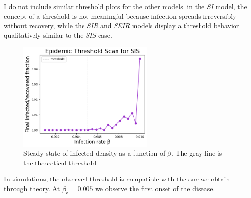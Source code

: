 I do not include similar threshold plots for the other models: in the \textit{SI} model, the concept of a threshold is not meaningful because infection spreads irreversibly without recovery, while the \textit{SIR} and \textit{SEIR} models display a threshold behavior qualitatively similar to the \textit{SIS} case.


\begin{figure}[H]
\centering
\includegraphics[width=0.6\textwidth]{images/Homogeneous/SIS_threshold.png}
\caption{Steady-state of infected density as a function of $\beta$. The gray line is the theoretical threshold}
\label{fig:threshold}
\end{figure}

In simulations, the observed threshold is compatible with the one we obtain through theory. At $\beta_c = 0.005$ we observe the first onset of the disease.





\newpage